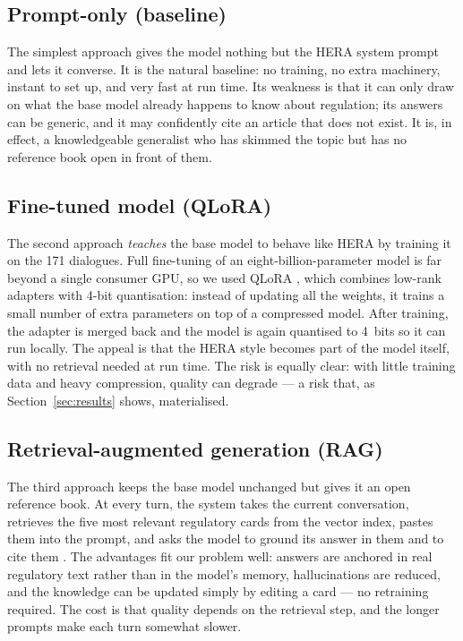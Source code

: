 \documentclass[11pt]{article}
\begin{document}
\subsection{Prompt-only (baseline)}

The simplest approach gives the model nothing but the HERA system prompt and lets it
converse. It is the natural baseline: no training, no extra machinery, instant to set up,
and very fast at run time. Its weakness is that it can only draw on what the base model
already happens to know about regulation; its answers can be generic, and it may
confidently cite an article that does not exist. It is, in effect, a knowledgeable
generalist who has skimmed the topic but has no reference book open in front of them.

\subsection{Fine-tuned model (QLoRA)}

The second approach \emph{teaches} the base model to behave like HERA by training it on
the 171 dialogues. Full fine-tuning of an eight-billion-parameter model is far beyond a
single consumer GPU, so we used QLoRA \citep{dettmers2023qlora}, which combines low-rank
adapters \citep{hu2022lora} with 4-bit quantisation: instead of updating all the weights,
it trains a small number of extra parameters on top of a compressed model. After
training, the adapter is merged back and the model is again quantised to 4~bits so it can
run locally. The appeal is that the HERA style becomes part of the model itself, with no
retrieval needed at run time. The risk is equally clear: with little training data and
heavy compression, quality can degrade --- a risk that, as Section~\ref{sec:results}
shows, materialised.

\subsection{Retrieval-augmented generation (RAG)}

The third approach keeps the base model unchanged but gives it an open reference book.
At every turn, the system takes the current conversation, retrieves the five most
relevant regulatory cards from the vector index, pastes them into the prompt, and asks
the model to ground its answer in them and to cite them \citep{lewis2020rag,
gao2023retrieval}. The advantages fit our problem well: answers are anchored in real
regulatory text rather than in the model's memory, hallucinations are reduced, and the
knowledge can be updated simply by editing a card --- no retraining required. The cost is
that quality depends on the retrieval step, and the longer prompts make each turn somewhat
slower.
\end{document}
